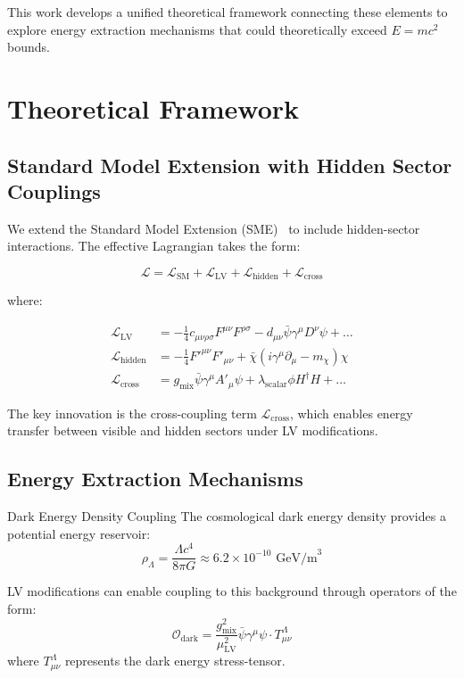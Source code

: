 \documentclass[12pt]{article}
\begin{document}
This work develops a unified theoretical framework connecting these elements to explore energy extraction mechanisms that could theoretically exceed $E=mc^2$ bounds.

\section{Theoretical Framework}

\subsection{Standard Model Extension with Hidden Sector Couplings}

We extend the Standard Model Extension (SME)~\cite{Colladay1997} to include hidden-sector interactions. The effective Lagrangian takes the form:

\begin{equation}
\mathcal{L} = \mathcal{L}_{\text{SM}} + \mathcal{L}_{\text{LV}} + \mathcal{L}_{\text{hidden}} + \mathcal{L}_{\text{cross}}
\end{equation}

where:

\begin{align}
\mathcal{L}_{\text{LV}} &= -\frac{1}{4}c_{\mu\nu\rho\sigma}F^{\mu\nu}F^{\rho\sigma} - d_{\mu\nu}\bar{\psi}\gamma^{\mu}D^{\nu}\psi + \ldots \\
\mathcal{L}_{\text{hidden}} &= -\frac{1}{4}F'^{\mu\nu}F'_{\mu\nu} + \bar{\chi}(i\gamma^{\mu}\partial_{\mu} - m_{\chi})\chi \\
\mathcal{L}_{\text{cross}} &= g_{\text{mix}}\bar{\psi}\gamma^{\mu}A'_{\mu}\psi + \lambda_{\text{scalar}}\phi H^\dagger H + \ldots
\end{align}

The key innovation is the cross-coupling term $\mathcal{L}_{\text{cross}}$, which enables energy transfer between visible and hidden sectors under LV modifications.

\subsection{Energy Extraction Mechanisms}

\begin{physicsbox}{Dark Energy Density Coupling}
The cosmological dark energy density provides a potential energy reservoir:
\begin{equation}
\rho_{\Lambda} = \frac{\Lambda c^4}{8\pi G} \approx 6.2 \times 10^{-10} \text{ GeV/m}^3
\end{equation}

LV modifications can enable coupling to this background through operators of the form:
\begin{equation}
\mathcal{O}_{\text{dark}} = \frac{g_{\text{mix}}^2}{\mu_{\text{LV}}^2} \bar{\psi}\gamma^{\mu}\psi \cdot T_{\mu\nu}^{\Lambda}
\end{equation}
where $T_{\mu\nu}^{\Lambda}$ represents the dark energy stress-tensor.
\end{physicsbox}
\end{document}
